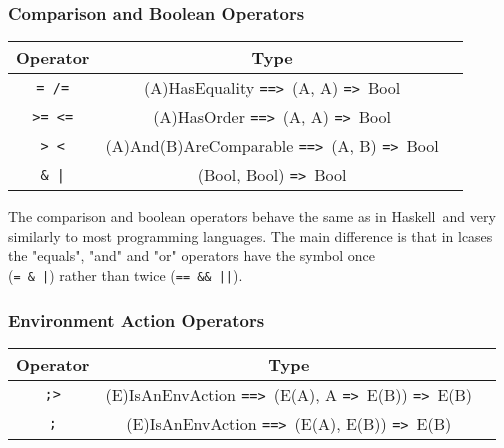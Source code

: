 \documentclass{article}
\def\H{Haskell}
\def\ra{\texttt{=>}\ }
\def\Ra{\texttt{==>}\ }
\begin{document}
\subsubsection{Comparison and Boolean Operators}

\begin{center}
\begin{tabular}{ |c|c|c| } 
\hline
Operator & Type \\ 
\hline
\hline
\texttt{= /=} & (A)HasEquality \Ra (A, A) \ra Bool \\
\hline
\texttt{>= <=} & (A)HasOrder \Ra (A, A) \ra Bool \\
\hline
\texttt{> <} & (A)And(B)AreComparable \Ra (A, B) \ra Bool \\
\hline
\texttt{\& |} & (Bool, Bool) \ra Bool \\
\hline
\end{tabular}
\end{center}
The comparison and boolean operators behave the same as in \H\ and very
similarly to most programming languages. The main difference is that in lcases
the "equals", "and" and "or" operators have the symbol once \\(\texttt{= \& |})
rather than twice (\texttt{== \&\& ||}).

\subsubsection{Environment Action Operators}
\label{subsec:envacts}

\begin{center}
\begin{tabular}{ |c|c|c| } 
\hline
Operator & Type \\ 
\hline
\hline
\texttt{;>} & (E)IsAnEnvAction \Ra (E(A), A \ra E(B)) \ra E(B) \\
\hline
\texttt{;} & (E)IsAnEnvAction \Ra (E(A), E(B)) \ra E(B) \\
\hline
\end{tabular}
\end{center}
\end{document}
